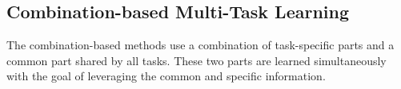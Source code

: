 

\subsection{Combination-based Multi-Task Learning}
The combination-based methods 
use a combination of task-specific parts and a common part shared by all tasks. These two parts are learned simultaneously with the goal of leveraging the common and specific information.


